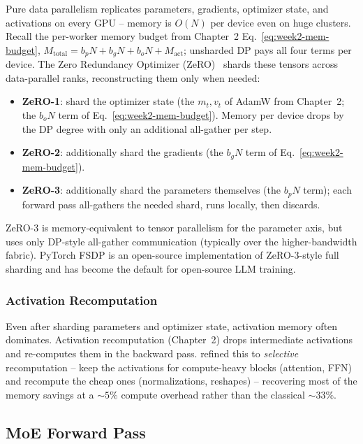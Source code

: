 Pure data parallelism replicates parameters, gradients, optimizer
state, and activations on every GPU -- memory is $O(N)$ per device
even on huge clusters. Recall the per-worker memory budget from
Chapter~2 Eq.~\eqref{eq:week2-mem-budget},
$M_{\mathrm{total}} = b_p N + b_g N + b_o N + M_{\mathrm{act}}$;
unsharded DP pays all four terms per device. The Zero Redundancy
Optimizer (ZeRO)~\citep{rajbhandari2020zero} shards these tensors
across data-parallel ranks, reconstructing them only when needed:
\begin{itemize}
  \item \textbf{ZeRO-1}: shard the optimizer state (the $m_t, v_t$ of
        AdamW from Chapter~2; the $b_o N$ term of
        Eq.~\eqref{eq:week2-mem-budget}). Memory per device drops by
        the DP degree with only an additional all-gather per step.
  \item \textbf{ZeRO-2}: additionally shard the gradients (the
        $b_g N$ term of Eq.~\eqref{eq:week2-mem-budget}).
  \item \textbf{ZeRO-3}: additionally shard the parameters themselves
        (the $b_p N$ term); each forward pass all-gathers the needed
        shard, runs locally, then discards.
\end{itemize}
ZeRO-3 is memory-equivalent to tensor parallelism for the
parameter axis, but uses only DP-style all-gather communication
(typically over the higher-bandwidth fabric). PyTorch FSDP
\citep{zhao2023fsdp} is an open-source implementation of
ZeRO-3-style full sharding and has become the default for
open-source LLM training.

\subsubsection{Activation Recomputation}

Even after sharding parameters and optimizer state, activation memory
often dominates. Activation recomputation \citep{chen2016training}
(Chapter~2) drops intermediate activations and re-computes them in the
backward pass. \citet{korthikanti2023reducing} refined this to
\emph{selective} recomputation -- keep the activations for
compute-heavy blocks (attention, FFN) and recompute the cheap ones
(normalizations, reshapes) -- recovering most of the memory savings
at a $\sim 5\%$ compute overhead rather than the classical $\sim 33\%$.

\subsection{MoE Forward Pass}

